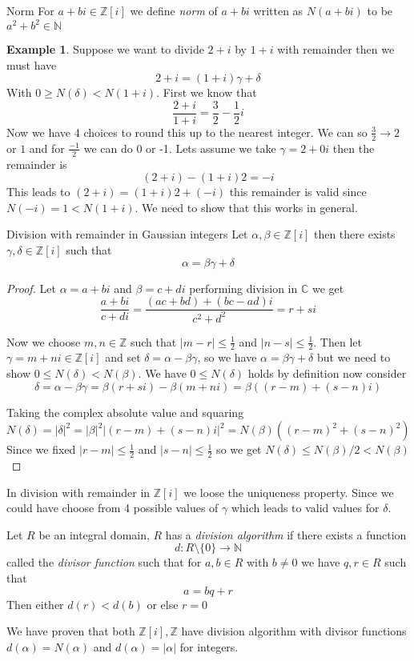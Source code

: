 \documentclass[16pt,a4paper]{article}
\theoremstyle{definition}
\newtheorem{example}{Example}
\begin{document}
\begin{defn}{Norm}{}
For $a+bi \in \mathbb{Z}[i]$ we define \emph{norm} of $a+bi$ written as $N(a+bi)$ to be $a^2 + b^2 \in \mathbb{N}$
\end{defn}
\begin{example}
Suppose we want to divide $2+i$ by $1+i$ with remainder then we must have 
\[2+i = (1+i)\gamma + \delta\]
With $0\geq N(\delta) <N(1+i)$. First we know that 
\[\frac{2+i}{1+i} = \frac{3}{2}-\frac{1}{2}i\]
Now we have 4 choices to round this up to the nearest integer. We can so $\frac{3}{2}\rightarrow 2$ or $1$ and for $\frac{-1}{2}$ we can do 0 or -1. Lets assume we take $\gamma = 2+0i$ then the remainder is 
\[(2+i)-(1+i)2 = -i\]
This leads to $(2+i) = (1+i)2 + (-i)$ this remainder is valid since $N(-i) = 1<N(1+i)$. We need to show that this works in general. 
\end{example}
\begin{thm}{Division with remainder in Gaussian integers}{}
Let $\alpha, \beta \in \mathbb{Z}[i]$ then there exists $\gamma, \delta \in \mathbb{Z}[i]$ such that 
\[\alpha = \beta \gamma + \delta\]
\end{thm}
\begin{proof}
Let $\alpha = a+bi$ and $\beta = c+di$ performing division in $\mathbb{C}$ we get
\[\frac{a+bi}{c+di} = \frac{(ac+bd) + (bc-ad)i}{c^2 + d^2} = r+si\]

Now we choose $m,n\in \mathbb{Z}$ such that $|m-r|\leq \frac{1}{2}$ and $|n-s|\leq \frac{1}{2}$. Then let $\gamma = m+ni\in \mathbb{Z}[i]$ and set $\delta = \alpha - \beta \gamma$, so we have $\alpha = \beta \gamma + \delta$ but we need to show $0\leq N(\delta)<N(\beta)$. We have $0\leq N(\delta)$ holds by definition now consider
\[\delta = \alpha - \beta \gamma = \beta (r+si) - \beta (m+ni) = \beta((r-m)+(s-n)i)\]

 Taking the complex absolute value and squaring $N(\delta) = |\delta|^2 = |\beta|^2|(r-m)+(s-n)i|^2 = N(\beta)((r-m)^2+(s-n)^2)$ 
Since we fixed $|r-m|\leq \frac{1}{2}$ and $|s-n|\leq \frac{1}{2}$ so we get $N(\delta) \leq N(\beta)/2<N(\beta)$

\end{proof}
\newpage
In division with remainder in $\mathbb{Z}[i]$ we loose the uniqueness property. Since we could have choose from 4 possible values of $\gamma$ which leads to valid values for $\delta$. 

\begin{defn}{}{}
Let $R$ be an integral domain, $R$ has a \emph{division algorithm} if there exists a function 
\[d:R\setminus \{0\}\rightarrow \mathbb{N}\] 
called the \emph{divisor function} such that for $a,b \in R$ with $b\neq 0$ we have $q,r\in R$ such that 
\[a=bq+r\]
Then either $d(r)<d(b)$ or else $r = 0$
\end{defn}
We have proven that both $\mathbb{Z}[i], \mathbb{Z}$ have division algorithm with divisor functions $d(\alpha) = N(\alpha)$ and $d(\alpha) = |\alpha|$ for integers. 
\end{document}

